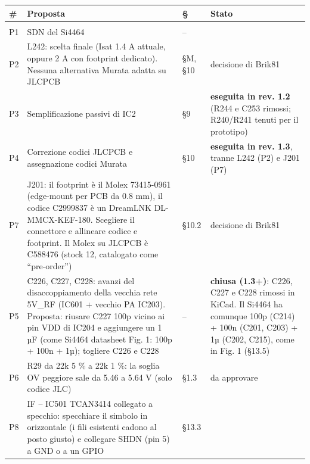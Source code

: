 {\footnotesize{}\setlength{\tabcolsep}{4pt}\renewcommand{\arraystretch}{1.1}
\begin{xltabular}{\linewidth}{>{\hsize\raggedright\arraybackslash}X>{\hsize\raggedright\arraybackslash}X>{\hsize\raggedright\arraybackslash}X>{\hsize\raggedright\arraybackslash}X}
\toprule
\textbf{\#} & \textbf{Proposta} & \textbf{§} & \textbf{Stato} \\
\midrule
\endhead
\midrule[0.15pt]\\\bottomrule\endfoot
\bottomrule\endlastfoot
P1 & SDN del Si4464 & – &  \\\midrule[0.15pt]
P2 & L242: scelta finale (Isat 1.4 A attuale, oppure 2 A con footprint dedicato). Nessuna alternativa Murata adatta su JLCPCB & §M, §10 & decisione di Brik81 \\\midrule[0.15pt]
P3 & Semplificazione passivi di IC2 & §9 & \textbf{eseguita in rev. 1.2} (R244 e C253 rimossi; R240/\allowbreak{}R241 tenuti per il prototipo) \\\midrule[0.15pt]
P4 & Correzione codici JLCPCB e assegnazione codici Murata & §10 & \textbf{eseguita in rev. 1.3}, tranne L242 (P2) e J201 (P7) \\\midrule[0.15pt]
P7 & J201: il footprint è il Molex 73415-0961 (edge-mount per PCB da 0.8 mm), il codice C2999837 è un DreamLNK DL-MMCX-KEF-180. Scegliere il connettore e allineare codice e footprint. Il Molex su JLCPCB è C588476 (stock 12, catalogato come \textquotedblleft{}pre-order\textquotedblright{}) & §10.2 & decisione di Brik81 \\\midrule[0.15pt]
P5 & C226, C227, C228: avanzi del disaccoppiamento della vecchia rete 5V\_\allowbreak{}RF (IC601 + vecchio PA IC203). Proposta: riusare C227 100p vicino ai pin VDD di IC204 e aggiungere un 1 µF (come Si4464 datasheet Fig. 1: 100p + 100n + 1µ); togliere C226 e C228 & – & \textbf{chiusa (1.3+)}: C226, C227 e C228 rimossi in KiCad. Il Si4464 ha comunque 100p (C214) + 100n (C201, C203) + 1µ (C202, C215), come in Fig. 1 (§13.5) \\\midrule[0.15pt]
P6 & R29 da 22k 5 \% a 22k 1 \%: la soglia OV peggiore sale da 5.46 a 5.64 V (solo codice JLC) & §1.3 & da approvare \\\midrule[0.15pt]
P8 &  IF – IC501 TCAN3414 collegato a specchio: specchiare il simbolo in orizzontale (i fili esistenti cadono al posto giusto) e collegare SHDN (pin 5) a GND o a un GPIO & §13.3 &  \\\midrule[0.15pt]

\end{xltabular}}
